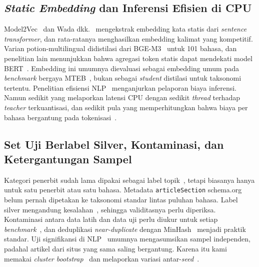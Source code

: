 \documentclass[journal]{IEEEtran}
\newcommand{\eng}[1]{\textit{#1}}   %
\begin{document}
\subsection{\eng{Static Embedding} dan Inferensi Efisien di CPU}
Model2Vec~\cite{tulkens2024model2vec} dan Wada dkk.~\cite{wada2025static} mengekstrak embedding kata statis dari \eng{sentence transformer}, dan rata-ratanya menghasilkan embedding kalimat yang kompetitif. Varian potion-multilingual didistilasi dari BGE-M3~\cite{chen2024bgem3} untuk 101 bahasa, dan penelitian lain menunjukkan bahwa agregasi token statis dapat mendekati model BERT~\cite{gupta2021static,stankevicius2024extracting}. Embedding ini umumnya dievaluasi sebagai embedding umum pada \eng{benchmark} bergaya MTEB~\cite{enevoldsen2025mmteb}, bukan sebagai \eng{student} distilasi untuk taksonomi tertentu. Penelitian efisiensi NLP~\cite{treviso2023efficient,luccioni2024power} menganjurkan pelaporan biaya inferensi. Namun sedikit yang melaporkan latensi CPU dengan sedikit \eng{thread} terhadap \eng{teacher} terkuantisasi, dan sedikit pula yang memperhitungkan bahwa biaya per bahasa bergantung pada tokenisasi~\cite{petrov2023tokenizers}.

\subsection{Set Uji Berlabel Silver, Kontaminasi, dan Ketergantungan Sampel}
Kategori penerbit sudah lama dipakai sebagai label topik~\cite{wang2022n24news,mirashi2023indicnews}, tetapi biasanya hanya untuk satu penerbit atau satu bahasa. Metadata \texttt{articleSection} schema.org~\cite{guha2016schema} belum pernah dipetakan ke taksonomi standar lintas puluhan bahasa. Label silver mengandung kesalahan~\cite{klie2023aed,song2023noisy,northcutt2021pervasive}, sehingga validitasnya perlu diperiksa. Kontaminasi antara data latih dan data uji perlu diukur untuk setiap \eng{benchmark}~\cite{sainz2023contamination,magar2022contamination,deng2024contamination}, dan deduplikasi \eng{near-duplicate} dengan MinHash~\cite{broder1997resemblance,lee2022dedup} menjadi praktik standar. Uji signifikansi di NLP~\cite{koehn2004significance,dror2018hitchhiker} umumnya mengasumsikan sampel independen, padahal artikel dari situs yang sama saling bergantung. Karena itu kami memakai \eng{cluster bootstrap}~\cite{field2007bootstrapping} dan melaporkan variasi antar-\eng{seed}~\cite{hagmann2023inferential}.



\end{document}
